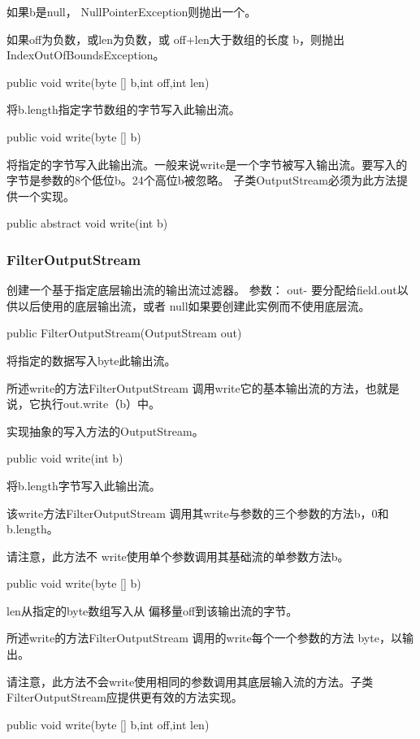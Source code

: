 如果b是null， NullPointerException则抛出一个。

如果off为负数，或len为负数，或 off+len大于数组的长度 b，则抛出IndexOutOfBoundsException。
\begin{java}
public void write(byte [] b,int off,int len)
\end{java}
将b.length指定字节数组的字节写入此输出流。
\begin{java}
public void write(byte [] b)
\end{java}
将指定的字节写入此输出流。一般来说write是一个字节被写入输出流。要写入的字节是参数的8个低位b。24个高位b被忽略。
子类OutputStream必须为此方法提供一个实现。
\begin{java}
public abstract void write(int b)
\end{java}

\subsubsection{FilterOutputStream}


创建一个基于指定底层输出流的输出流过滤器。
参数：
out- 要分配给field.out以供以后使用的底层输出流，或者 null如果要创建此实例而不使用底层流。
\begin{java}
public FilterOutputStream(OutputStream  out)
\end{java}
将指定的数据写入byte此输出流。

所述write的方法FilterOutputStream 调用write它的基本输出流的方法，也就是说，它执行out.write（b）中。

实现抽象的写入方法的OutputStream。

\begin{java}
public void write(int b)
\end{java}
将b.length字节写入此输出流。

该write方法FilterOutputStream 调用其write与参数的三个参数的方法b，0和 b.length。

请注意，此方法不 write使用单个参数调用其基础流的单参数方法b。
\begin{java}
public void write(byte [] b)
\end{java}
len从指定的byte数组写入从 偏移量off到该输出流的字节。

所述write的方法FilterOutputStream 调用的write每个一个参数的方法 byte，以输出。

请注意，此方法不会write使用相同的参数调用其底层输入流的方法。子类FilterOutputStream应提供更有效的方法实现。

\begin{java}
public void write(byte [] b,int off,int len)
\end{java}

